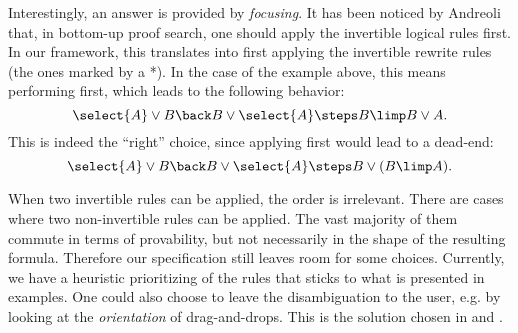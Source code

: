 Interestingly, an answer is provided by {\em
  focusing}. It has been noticed by Andreoli~\cite{andreoli1992} that, in
bottom-up proof search, one should apply the invertible logical
rules first. In our framework, this translates into first applying the
invertible rewrite rules (the ones marked by a *).  In the case of the
example above, this means performing  first, which
leads to the following behavior:
$$\select{A}\lor B \back B\lor\select{A}\steps B\limp B\lor A.$$
This is indeed the ``right'' choice, since applying 
first would lead to a dead-end:
$$\select{A}\lor B \back B\lor\select{A}\steps B\lor(B\limp A).$$

When two invertible rules can be applied, the order is irrelevant. There are
cases where two non-invertible rules can be applied. The vast majority of them
commute in terms of provability, but not necessarily in the shape of the
resulting formula. Therefore our specification still leaves
room for some choices. Currently, we have a heuristic prioritizing of the rules
that sticks to what is presented in examples. One could also choose to leave the
disambiguation to the user, e.g. by looking at the \emph{orientation} of
drag-and-drops. This is the solution chosen in \cite{Chaudhuri2013} and
\cite{DBLP:conf/cade/Chaudhuri21}.




